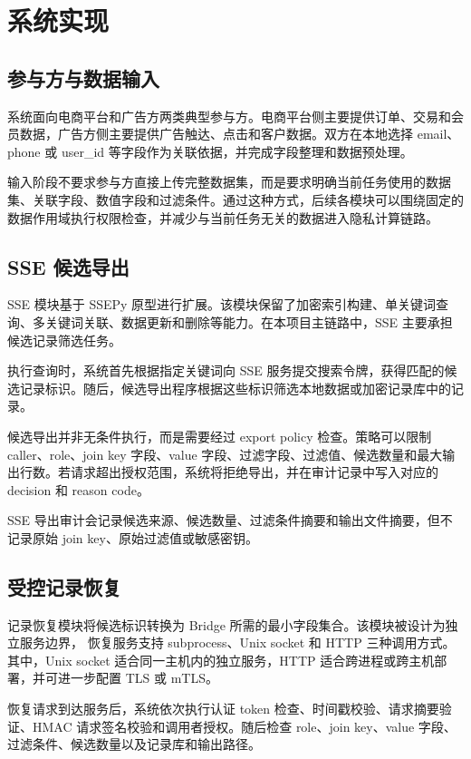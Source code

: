 \documentclass[UTF8,a4paper,12pt,oneside]{ctexrep}
\begin{document}
\section{系统实现}

\subsection{参与方与数据输入}

系统面向电商平台和广告方两类典型参与方。电商平台侧主要提供订单、交易和会员数据，广告方侧主要提供广告触达、点击和客户数据。双方在本地选择 email、phone 或 user\_id 等字段作为关联依据，并完成字段整理和数据预处理。

输入阶段不要求参与方直接上传完整数据集，而是要求明确当前任务使用的数据集、关联字段、数值字段和过滤条件。通过这种方式，后续各模块可以围绕固定的数据作用域执行权限检查，并减少与当前任务无关的数据进入隐私计算链路。

\subsection{SSE 候选导出}

SSE 模块基于 SSEPy 原型进行扩展。该模块保留了加密索引构建、单关键词查询、多关键词关联、数据更新和删除等能力。在本项目主链路中，SSE 主要承担候选记录筛选任务。

执行查询时，系统首先根据指定关键词向 SSE 服务提交搜索令牌，获得匹配的候选记录标识。随后，候选导出程序根据这些标识筛选本地数据或加密记录库中的记录。

候选导出并非无条件执行，而是需要经过 export policy 检查。策略可以限制 caller、role、join key 字段、value 字段、过滤字段、过滤值、候选数量和最大输出行数。若请求超出授权范围，系统将拒绝导出，并在审计记录中写入对应的 decision 和 reason code。

SSE 导出审计会记录候选来源、候选数量、过滤条件摘要和输出文件摘要，但不记录原始 join key、原始过滤值或敏感密钥。

\subsection{受控记录恢复}

记录恢复模块将候选标识转换为 Bridge 所需的最小字段集合。该模块被设计为独立服务边界，
恢复服务支持 subprocess、Unix socket 和 HTTP 三种调用方式。其中，Unix socket 适合同一主机内的独立服务，HTTP 适合跨进程或跨主机部署，并可进一步配置 TLS 或 mTLS。

恢复请求到达服务后，系统依次执行认证 token 检查、时间戳校验、请求摘要验证、HMAC 请求签名校验和调用者授权。随后检查 role、join key、value 字段、过滤条件、候选数量以及记录库和输出路径。
\end{document}
